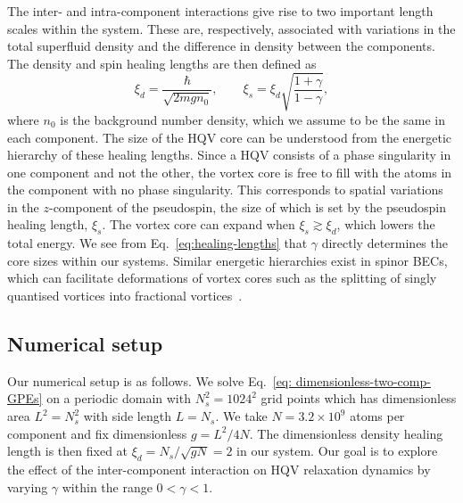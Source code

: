 The inter- and intra-component interactions give rise to two important length
scales within the system.
These are, respectively, associated with variations in the total superfluid
density and the difference in density between the components.
The density and spin healing lengths are then defined as~\cite{Eto2011}
\begin{equation}
    \xi_d = \frac{\hbar}{\sqrt{2mgn_0}}, \qquad
    \xi_s = \xi_d \sqrt{\frac{1 + \gamma}{1 - \gamma}},
    \label{eq:healing-lengths}
\end{equation}
where \(n_0\) is the background number density, which we assume to be the same
in each component.
The size of the HQV core can be understood from the energetic hierarchy of
these healing lengths.
Since a HQV consists of a phase singularity in one component and not the other,
the vortex core is free to fill with the atoms in the component with no phase
singularity.
This corresponds to spatial variations in the \( z \)-component of the
pseudospin, the size of which is set by the pseudospin healing length,
\(\xi_s\).
The vortex core can expand when \(\xi_s \gtrsim \xi_d\), which lowers
the total energy.
We see from Eq.~\eqref{eq:healing-lengths} that \(\gamma \) directly determines
the core sizes within our systems.
Similar energetic hierarchies exist in spinor BECs, which can facilitate
deformations of vortex cores such as the splitting of singly quantised vortices
into fractional vortices~\cite{Seo2015}.

\subsection{Numerical setup}\label{subsec: two-comp-numerical-setup}
Our numerical setup is as follows.
We solve Eq.~\eqref{eq: dimensionless-two-comp-GPEs} on a periodic domain with
\(N_s^2=1024^2\) grid points which has dimensionless area \(L^2=N_s^2\) with
side length \(L=N_s\).
We take \(N=3.2\times10^9\) atoms per component and fix dimensionless
\(g=L^2/4N\).
The dimensionless density healing length is then fixed at
\(\xi_d=N_s/\sqrt{gN}=2\) in our system.
Our goal is to explore the effect of the inter-component interaction on HQV
relaxation dynamics by varying \(\gamma \) within the range \(0 < \gamma < 1\).

